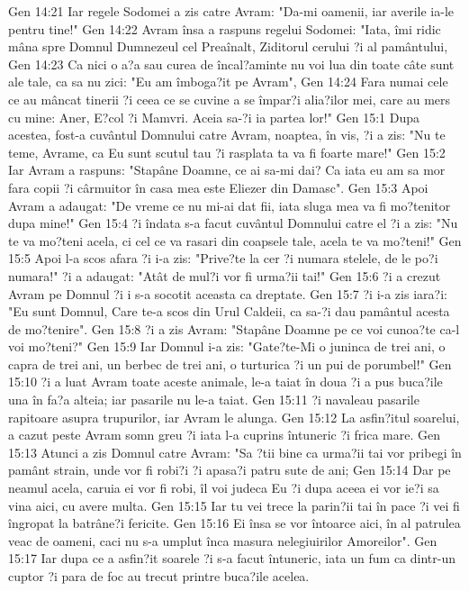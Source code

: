 Gen 14:21  Iar regele Sodomei a zis catre Avram: "Da-mi oamenii, iar averile ia-le pentru tine!"
Gen 14:22  Avram însa a raspuns regelui Sodomei: "Iata, îmi ridic mâna spre Domnul Dumnezeul cel Preaînalt, Ziditorul cerului ?i al pamântului,
Gen 14:23  Ca nici o a?a sau curea de încal?aminte nu voi lua din toate câte sunt ale tale, ca sa nu zici: "Eu am îmboga?it pe Avram",
Gen 14:24  Fara numai cele ce au mâncat tinerii ?i ceea ce se cuvine a se împar?i alia?ilor mei, care au mers cu mine: Aner, E?col ?i Mamvri. Aceia sa-?i ia partea lor!"
Gen 15:1  Dupa acestea, fost-a cuvântul Domnului catre Avram, noaptea, în vis, ?i a zis: "Nu te teme, Avrame, ca Eu sunt scutul tau ?i rasplata ta va fi foarte mare!"
Gen 15:2  Iar Avram a raspuns: "Stapâne Doamne, ce ai sa-mi dai? Ca iata eu am sa mor fara copii ?i cârmuitor în casa mea este Eliezer din Damasc".
Gen 15:3  Apoi Avram a adaugat: "De vreme ce nu mi-ai dat fii, iata sluga mea va fi mo?tenitor dupa mine!"
Gen 15:4  ?i îndata s-a facut cuvântul Domnului catre el ?i a zis: "Nu te va mo?teni acela, ci cel ce va rasari din coapsele tale, acela te va mo?teni!"
Gen 15:5  Apoi l-a scos afara ?i i-a zis: "Prive?te la cer ?i numara stelele, de le po?i numara!" ?i a adaugat: "Atât de mul?i vor fi urma?ii tai!"
Gen 15:6  ?i a crezut Avram pe Domnul ?i i s-a socotit aceasta ca dreptate.
Gen 15:7  ?i i-a zis iara?i: "Eu sunt Domnul, Care te-a scos din Urul Caldeii, ca sa-?i dau pamântul acesta de mo?tenire".
Gen 15:8  ?i a zis Avram: "Stapâne Doamne pe ce voi cunoa?te ca-l voi mo?teni?"
Gen 15:9  Iar Domnul i-a zis: "Gate?te-Mi o juninca de trei ani, o capra de trei ani, un berbec de trei ani, o turturica ?i un pui de porumbel!"
Gen 15:10  ?i a luat Avram toate aceste animale, le-a taiat în doua ?i a pus buca?ile una în fa?a alteia; iar pasarile nu le-a taiat.
Gen 15:11  ?i navaleau pasarile rapitoare asupra trupurilor, iar Avram le alunga.
Gen 15:12  La asfin?itul soarelui, a cazut peste Avram somn greu ?i iata l-a cuprins întuneric ?i frica mare.
Gen 15:13  Atunci a zis Domnul catre Avram: "Sa ?tii bine ca urma?ii tai vor pribegi în pamânt strain, unde vor fi robi?i ?i apasa?i patru sute de ani;
Gen 15:14  Dar pe neamul acela, caruia ei vor fi robi, îl voi judeca Eu ?i dupa aceea ei vor ie?i sa vina aici, cu avere multa.
Gen 15:15  Iar tu vei trece la parin?ii tai în pace ?i vei fi îngropat la batrâne?i fericite.
Gen 15:16  Ei însa se vor întoarce aici, în al patrulea veac de oameni, caci nu s-a umplut înca masura nelegiuirilor Amoreilor".
Gen 15:17  Iar dupa ce a asfin?it soarele ?i s-a facut întuneric, iata un fum ca dintr-un cuptor ?i para de foc au trecut printre buca?ile acelea.
